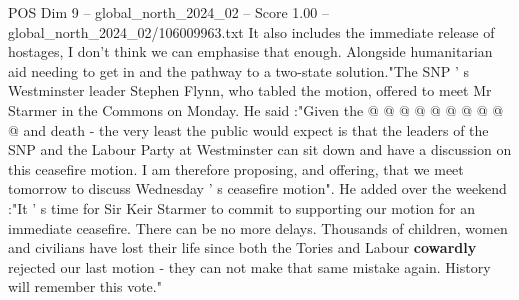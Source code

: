 \begin{textsample}{POS Dim 9 – global\_north\_2024\_02 – Score 1.00 – global\_north\_2024\_02/106009963.txt}
It also includes the immediate release of hostages, I don't think we can emphasise that enough.
Alongside humanitarian aid needing to get in and the pathway to a two-state solution."The SNP ' s Westminster leader Stephen Flynn, who tabled the motion, offered to meet Mr Starmer in the Commons on Monday.
He said :"Given the @ @ @ @ @ @ @ @ @ @ and death - the very least the public would expect is that the leaders of the SNP and the Labour Party at Westminster can sit down and have a discussion on this ceasefire motion.
I am therefore proposing, and offering, that we meet tomorrow to discuss Wednesday ' s ceasefire motion".
He added over the weekend :"It ' s time for Sir Keir Starmer to commit to supporting our motion for an immediate ceasefire.
There can be no more delays.
Thousands of children, women and civilians have lost their life since both the Tories and Labour \textbf{cowardly} rejected our last motion - they can not make that same mistake again.
History will remember this vote."

\end{textsample}
